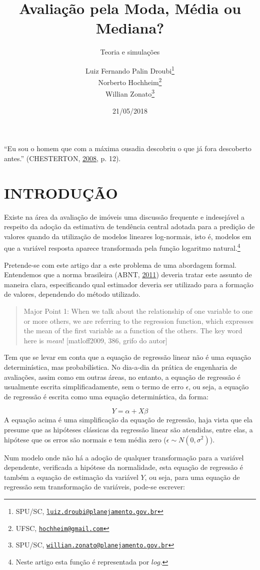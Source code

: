 \documentclass[a4paper]{article}
\title{Avaliação pela Moda, Média ou Mediana?}
\subtitle{Teoria e simulações}
\author{Luiz Fernando Palin Droubi\footnote{SPU/SC,
  \href{mailto:luiz.droubi@planejamento.gov.br}{\nolinkurl{luiz.droubi@planejamento.gov.br}}} \\ Norberto Hochheim\footnote{UFSC,
  \href{mailto:hochheim@gmail.com}{\nolinkurl{hochheim@gmail.com}}} \\ Willian Zonato\footnote{SPU/SC,
  \href{mailto:willian.zonato@planejamento.gov.br}{\nolinkurl{willian.zonato@planejamento.gov.br}}}}
\date{21/05/2018}
\let\rmarkdownfootnote\footnote%
\def\footnote{\protect\rmarkdownfootnote}
\begin{document}
\maketitle

``Eu sou o homem que com a máxima ousadia descobriu o que já fora
descoberto antes.'' (CHESTERTON,
\protect\hyperlink{ref-gkchesterton}{2008}, p. 12).

\section{INTRODUÇÃO}\label{introducao}

Existe na área da avaliação de imóveis uma discussão frequente e
indesejável a respeito da adoção da estimativa de tendência central
adotada para a predição de valores quando da utilização de modelos
lineares log-normais, isto é, modelos em que a variável resposta aparece
transformada pela função logaritmo natural.\footnote{Neste artigo esta
  função é representada por \(log\).}

Pretende-se com este artigo dar a este problema de uma abordagem formal.
Entendemos que a norma brasileira (ABNT,
\protect\hyperlink{ref-NBR1465302}{2011}) deveria tratar este assunto de
maneira clara, especificando qual estimador deveria ser utilizado para a
formação de valores, dependendo do método utilizado.

\begin{quote}
Major Point 1: When we talk about the relationship of one variable to
one or more others, we are referring to the regression function, which
expresses the mean of the first variable as a function of the others.
The key word here is \emph{mean}! {[}matloff2009, 386, grifo do autor{]}
\end{quote}

Tem que se levar em conta que a equação de regressão linear não é uma
equação determinística, mas probabilística. No dia-a-dia da prática de
engenharia de avaliações, assim como em outras áreas, no entanto, a
equação de regressão é usualmente escrita simplificadamente, sem o termo
de erro \(\epsilon\), ou seja, a equação de regressão é escrita como uma
equação determinística, da forma:

\[Y = \alpha + X\beta\] A equação acima é uma simplificação da equação
de regressão, haja vista que ela presume que as hipóteses clássicas da
regressão linear são atendidas, entre elas, a hipótese que os erros são
normais e tem média zero (\(\epsilon \sim N(0, \sigma^2)\)).

Num modelo onde não há a adoção de qualquer transformação para a
variável dependente, verificada a hipótese da normalidade, esta equação
de regressão é também a equação de estimação da variável \(Y\), ou seja,
para uma equação de regressão sem transformação de variáveis, pode-se
escrever:
\end{document}
